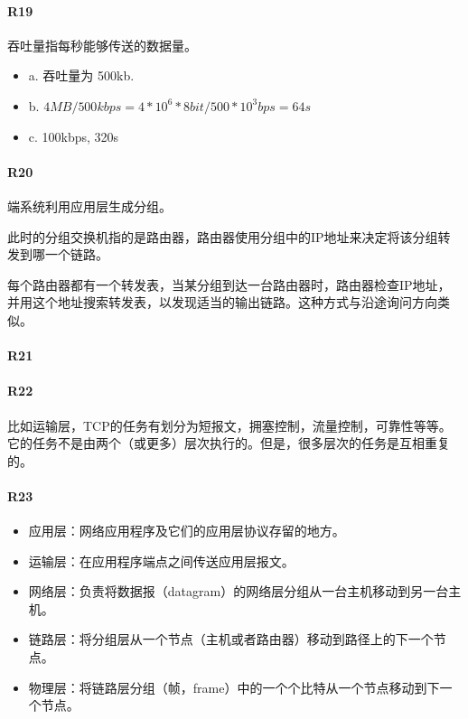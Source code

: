 \paragraph*{R19}
吞吐量指每秒能够传送的数据量。

\begin{itemize}
  \item a. 吞吐量为 500kb.
  \item b. $4MB/500kbps=4*10^6*8 bit / 500*10^3 bps = 64s$
  \item c. 100kbps, 320s
\end{itemize}

\paragraph*{R20}
端系统利用应用层生成分组。

此时的分组交换机指的是路由器，路由器使用分组中的IP地址来决定将该分组转发到哪一个链路。

每个路由器都有一个转发表，当某分组到达一台路由器时，路由器检查IP地址，并用这个地址搜索转发表，以发现适当的输出链路。这种方式与沿途询问方向类似。

\paragraph*{R21}

\paragraph*{R22}
比如运输层，TCP的任务有划分为短报文，拥塞控制，流量控制，可靠性等等。它的任务不是由两个（或更多）层次执行的。但是，很多层次的任务是互相重复的。

\paragraph*{R23}
\begin{itemize}
  \item 应用层：网络应用程序及它们的应用层协议存留的地方。
  \item 运输层：在应用程序端点之间传送应用层报文。
  \item 网络层：负责将数据报（datagram）的网络层分组从一台主机移动到另一台主机。
  \item 链路层：将分组层从一个节点（主机或者路由器）移动到路径上的下一个节点。
  \item 物理层：将链路层分组（帧，frame）中的一个个比特从一个节点移动到下一个节点。
\end{itemize}

